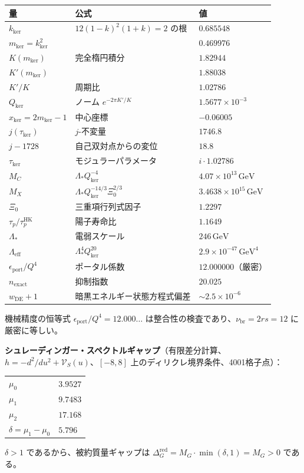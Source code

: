 \documentclass[12pt]{article}
\theoremstyle{plain}
\theoremstyle{definition}
\numberwithin{equation}{section}
\newcommand{\red}{\mathrm{red}}
\newcommand{\br}{\mathrm{br}}
\newcommand{\kker}{\mathrm{ker}}
\begin{document}
\begin{center}
\begin{tabular}{lll}
\toprule
量 & 公式 & 値\\
\midrule
$k_{\kker}$ & $12(1-k)^2(1+k)=2$ の根 & $0.685548$\\
$m_{\kker}=k_{\kker}^2$ & & $0.469976$\\
$K(m_{\kker})$ & 完全楕円積分 & $1.82944$\\
$K'(m_{\kker})$ & & $1.88038$\\
$K'/K$ & 周期比 & $1.02786$\\
$Q_{\kker}$ & ノーム $e^{-2\pi K'/K}$ & $1.5677\times 10^{-3}$\\
$x_{\kker}=2m_{\kker}-1$ & 中心座標 & $-0.06005$\\
$j(\tau_{\kker})$ & $j$-不変量 & $1746.8$\\
$j-1728$ & 自己双対点からの変位 & $18.8$\\
$\tau_{\kker}$ & モジュラーパラメータ & $i\cdot 1.02786$\\
\midrule
$M_C$ & $\Lambda_* Q_{\kker}^{-4}$ & $4.07\times 10^{13}\,\mathrm{GeV}$\\
$M_X$ & $\Lambda_* Q_{\kker}^{-14/3}\Xi_0^{2/3}$ & $3.4638\times 10^{15}\,\mathrm{GeV}$\\
$\Xi_0$ & 三重項行列式因子 & $1.2297$\\
$\tau_p/\tau_p^{\mathrm{HK}}$ & 陽子寿命比 & $1.1649$\\
$\Lambda_*$ & 電弱スケール & $246\,\mathrm{GeV}$\\
$\Lambda_{\mathrm{eff}}$ & $\Lambda_*^4 Q_{\kker}^{20}$ & $2.9\times 10^{-47}\,\mathrm{GeV}^4$\\
$\epsilon_{\mathrm{port}}/Q^4$ & ポータル係数 & $12.000000$（厳密）\\
$n_{\mathrm{exact}}$ & 抑制指数 & $20.025$\\
$w_{\mathrm{DE}}+1$ & 暗黒エネルギー状態方程式偏差 & $\sim 2.5\times 10^{-6}$\\
\bottomrule
\end{tabular}
\end{center}

機械精度の恒等式 $\epsilon_{\mathrm{port}}/Q^4=12.000\ldots$ は整合性の検査であり、$\nu_{\br}=2rs=12$ に厳密に等しい。

\medskip

\noindent\textbf{シュレーディンガー・スペクトルギャップ}（有限差分計算、$h=-d^2/du^2+\mathcal{V}_S(u)$、$[-8,8]$ 上のディリクレ境界条件、4001格子点）：
\begin{center}
\begin{tabular}{ll}
$\mu_0$ & $3.9527$\\
$\mu_1$ & $9.7483$\\
$\mu_2$ & $17.168$\\
$\delta=\mu_1-\mu_0$ & $5.796$\\
\end{tabular}
\end{center}
$\delta>1$ であるから、被約質量ギャップは $\Delta_G^{\red}=M_G\cdot\min(\delta,1)=M_G>0$ である。
\end{document}
